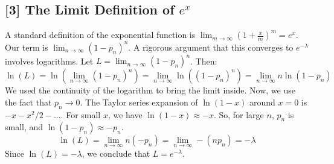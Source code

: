 \documentclass[11pt,a4paper]{article}
\begin{document}
\subsection*{[3] The Limit Definition of $e^x$}
\label{note:exp_limit}
A standard definition of the exponential function is $\lim_{m \to \infty} \left(1 + \frac{x}{m}\right)^m = e^x$. Our term is $\lim_{n \to \infty} (1-p_n)^n$. A rigorous argument that this converges to $e^{-\lambda}$ involves logarithms. Let $L = \lim_{n \to \infty} (1-p_n)^n$. Then:
\[
\ln(L) = \ln \left( \lim_{n \to \infty} (1-p_n)^n \right) = \lim_{n \to \infty} \ln \left( (1-p_n)^n \right) = \lim_{n \to \infty} n \ln(1-p_n)
\]
We used the continuity of the logarithm to bring the limit inside. Now, we use the fact that $p_n \to 0$. The Taylor series expansion of $\ln(1-x)$ around $x=0$ is $-x - x^2/2 - \dots$. For small $x$, we have $\ln(1-x) \approx -x$. So, for large $n$, $p_n$ is small, and $\ln(1-p_n) \approx -p_n$.
\[
\ln(L) = \lim_{n \to \infty} n (-p_n) = \lim_{n \to \infty} -(np_n) = -\lambda
\]
Since $\ln(L) = -\lambda$, we conclude that $L = e^{-\lambda}$.
\end{document}
